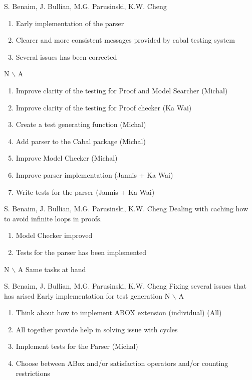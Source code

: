 %
{S. Benaim, J. Bullian, M.G. Parusinski, K.W. Cheng}%
{}%
{\begin{enumerate}
\item Early implementation of the parser
\item Clearer and more consistent messages provided by cabal testing system
\item Several issues has been corrected
\end{enumerate}}%
{N $\backslash$ A}
{\begin{enumerate}
\item Improve clarity of the testing for Proof and Model Searcher (Michal)
\item Improve clarity of the testing for Proof checker (Ka Wai)
\item Create a test generating function (Michal)
\item Add parser to the Cabal package (Michal)
\item Improve Model Checker (Michal)
\item Improve parser implementation (Jannis + Ka Wai)
\item Write tests for the parser (Jannis + Ka Wai)
\end{enumerate}}%

%
{S. Benaim, J. Bullian, M.G. Parusinski, K.W. Cheng}%
{Dealing with caching how to avoid infinite loops in proofs.}%
{\begin{enumerate}
\item Model Checker improved
\item Tests for the parser has been implemented
\end{enumerate}}%
{N $\backslash$ A}
{Same tasks at hand}%

%
{S. Benaim, J. Bullian, M.G. Parusinski, K.W. Cheng}%
{Fixing several issues that has arised
}%
{Early implementation for test generation}%
{N $\backslash$ A}
{\begin{enumerate}
\item Think about how to implement ABOX extension (individual) (All)
\item All together provide help in solving issue with cycles
\item Implement tests for the Parser (Michal)
\item Choose between ABox and/or satisfaction operators and/or counting restrictions
\end{enumerate}}%

